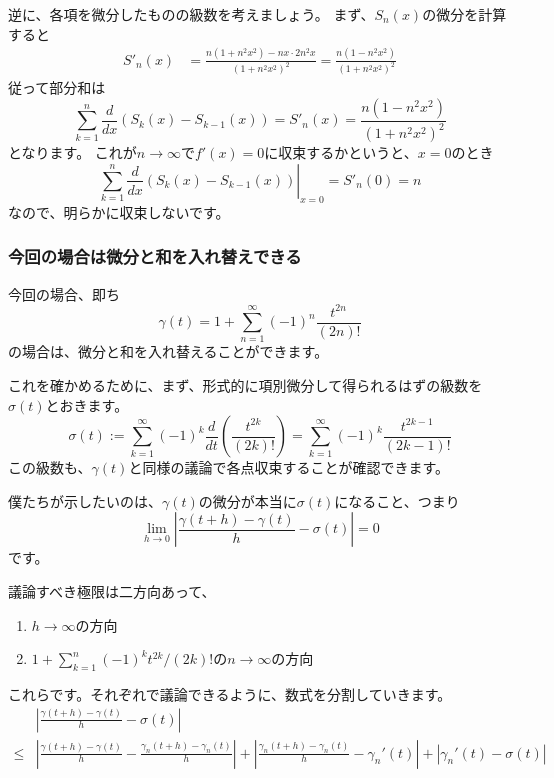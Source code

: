 逆に、各項を微分したものの級数を考えましょう。
まず、$S_n(x)$の微分を計算すると
\begin{align*}
  S'_n(x)&=\frac{n(1+n^2x^2)-nx\cdot 2n^2x}{(1+n^2x^2)^2}=\frac{n(1-n^2x^2)}{(1+n^2x^2)^2}
\end{align*}
従って部分和は
\[
  \sum_{k=1}^n\frac{d}{dx}(S_k(x)-S_{k-1}(x))=S'_n(x)=\frac{n(1-n^2x^2)}{(1+n^2x^2)^2}
\]
となります。
これが$n\to\infty$で$f'(x)=0$に収束するかというと、$x=0$のとき
\[
  \sum_{k=1}^n\left.\frac{d}{dx}(S_k(x)-S_{k-1}(x))\right|_{x=0}=S'_n(0)=n
\]
なので、明らかに収束しないです。

\subsubsection*{今回の場合は微分と和を入れ替えできる}

今回の場合、即ち
\[
  \gamma(t)=1+\sum_{n=1}^\infty(-1)^n\frac{t^{2n}}{(2n)!}
\]
の場合は、微分と和を入れ替えることができます。

これを確かめるために、まず、形式的に項別微分して得られるはずの級数を$\sigma(t)$とおきます。
\[
  \sigma(t):=\sum_{k=1}^\infty(-1)^k\frac{d}{dt}\left(\frac{t^{2k}}{(2k)!}\right)=\sum_{k=1}^\infty(-1)^k\frac{t^{2k-1}}{(2k-1)!}
\]
この級数も、$\gamma(t)$と同様の議論で各点収束することが確認できます。

僕たちが示したいのは、$\gamma(t)$の微分が本当に$\sigma(t)$になること、つまり
\[
  \lim_{h\to0}\left|\frac{\gamma(t+h)-\gamma(t)}{h}-\sigma(t)\right|=0
\]
です。

議論すべき極限は二方向あって、
\begin{enumerate}
  \item $h\to\infty$の方向
  \item $\displaystyle 1+\sum_{k=1}^n(-1)^{k}t^{2k}/(2k)!$の$n\to\infty$の方向
\end{enumerate}

これらです。それぞれで議論できるように、数式を分割していきます。
\begin{align*}
  &\left|\frac{\gamma(t+h)-\gamma(t)}{h}-\sigma(t)\right|\\
  \leq&\left|\frac{\gamma(t+h)-\gamma(t)}{h}-\frac{\gamma_n(t+h)-\gamma_n(t)}{h}\right| + \left|\frac{\gamma_n(t+h)-\gamma_n(t)}{h}-\gamma_n'(t)\right| + \left|\gamma_n'(t)-\sigma(t)\right|
\end{align*}




